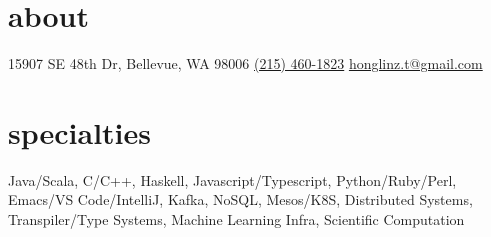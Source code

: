 \documentclass[]{friggeri-cv-a4}
\begin{document}


\begin{aside} %
\section{about}
15907 SE 48th Dr,
Bellevue, WA
98006
\href{tel:(215) 460-1823}{(215) 460-1823}
\href{mailto:honglinz.t@gmail.com}{honglinz.t@gmail.com}
\section{specialties}
Java/Scala, C/C++, Haskell, Javascript/Typescript, Python/Ruby/Perl, Emacs/VS Code/IntelliJ, Kafka, NoSQL, Mesos/K8S, Distributed Systems, Transpiler/Type Systems, Machine Learning Infra, Scientific Computation
\end{aside}

\end{document}
